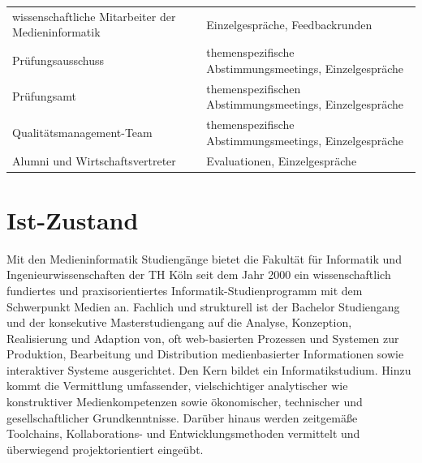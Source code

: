 \begin{longtable}[]{@{}ll@{}}
\begin{minipage}[t]{0.5\columnwidth}
wissenschaftliche Mitarbeiter der Medieninformatik\strut
\end{minipage} & \begin{minipage}[t]{0.5\columnwidth}\raggedright\strut
Einzelgespräche, Feedbackrunden\strut
\end{minipage}\tabularnewline
\begin{minipage}[t]{0.5\columnwidth}\raggedright\strut
Prüfungsausschuss\strut
\end{minipage} & \begin{minipage}[t]{0.5\columnwidth}\raggedright\strut
themenspezifische Abstimmungsmeetings, Einzelgespräche\strut
\end{minipage}\tabularnewline
\begin{minipage}[t]{0.5\columnwidth}\raggedright\strut
Prüfungsamt\strut
\end{minipage} & \begin{minipage}[t]{0.5\columnwidth}\raggedright\strut
themenspezifischen Abstimmungsmeetings, Einzelgespräche\strut
\end{minipage}\tabularnewline
\begin{minipage}[t]{0.5\columnwidth}\raggedright\strut
Qualitätsmanagement-Team\strut
\end{minipage} & \begin{minipage}[t]{0.5\columnwidth}\raggedright\strut
themenspezifische Abstimmungsmeetings, Einzelgespräche\strut
\end{minipage}\tabularnewline
\begin{minipage}[t]{0.5\columnwidth}\raggedright\strut
Alumni und Wirtschaftsvertreter\strut
\end{minipage} & \begin{minipage}[t]{0.5\columnwidth}\raggedright\strut
Evaluationen, Einzelgespräche\strut
\end{minipage}\tabularnewline
\bottomrule
\end{longtable}

\chapter{Ist-Zustand}\label{ist-zustand}

Mit den Medieninformatik Studiengänge bietet die Fakultät für Informatik
und Ingenieurwissenschaften der TH Köln seit dem Jahr 2000 ein
wissenschaftlich fundiertes und praxisorientiertes
Informatik-Studienprogramm mit dem Schwerpunkt Medien an. Fachlich und
strukturell ist der Bachelor Studiengang und der konsekutive
Masterstudiengang auf die Analyse, Konzeption, Realisierung und Adaption
von, oft web-basierten Prozessen und Systemen zur Produktion,
Bearbeitung und Distribution medienbasierter Informationen sowie
interaktiver Systeme ausgerichtet. Den Kern bildet ein
Informatikstudium. Hinzu kommt die Vermittlung umfassender,
vielschichtiger analytischer wie konstruktiver Medienkompetenzen sowie
ökonomischer, technischer und gesellschaftlicher Grundkenntnisse.
Darüber hinaus werden zeitgemäße Toolchains, Kollaborations- und
Entwicklungsmethoden vermittelt und überwiegend projektorientiert
eingeübt.

